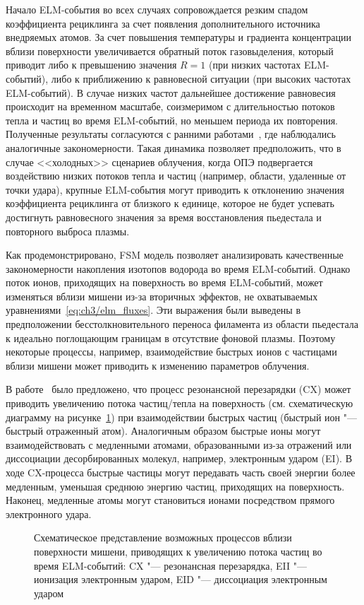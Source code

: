 Начало ELM-события во всех случаях сопровождается резким спадом коэффициента рециклинга за счет появления дополнительного источника внедряемых атомов. За счет повышения температуры и градиента концентрации вблизи поверхности увеличивается обратный поток газовыделения, который приводит либо к превышению значения \(R=1\) (при низких частотах ELM-событий), либо к приближению к равновесной ситуации (при высоких частотах ELM-событий). В случае низких частот дальнейшее достижение равновесия происходит на временном масштабе, соизмеримом с длительностью потоков тепла и частиц во время ELM-событий, но меньшем периода их повторения. Полученные результаты согласуются с ранними работами~\cite{Schmid2016,Smirnov2024}, где наблюдались аналогичные закономерности. Такая динамика позволяет предположить, что в случае <<холодных>> сценариев облучения, когда ОПЭ подвергается воздействию низких потоков тепла и частиц (например, области, удаленные от точки удара), крупные ELM-события могут приводить к отклонению значения коэффициента рециклинга от близкого к единице, которое не будет успевать достигнуть равновесного значения за время восстановления пьедестала и повторного выброса плазмы.  

Как продемонстрировано, FSM модель позволяет анализировать качественные закономерности накопления изотопов водорода во время ELM-событий. Однако поток ионов, приходящих на поверхность во время ELM-событий, может изменяться вблизи мишени из-за вторичных эффектов, не охватываемых уравнениями~\cref{eq:ch3/elm_fluxes}. Эти выражения были выведены в предположении бесстолкновительного переноса филамента из области пьедестала к идеально поглощающим границам в отсутствие фоновой плазмы. Поэтому некоторые процессы, например, взаимодействие быстрых ионов с частицами вблизи мишени может приводить к изменению параметров облучения.

В работе~\cite{Guillemaut2018} было предложено, что процесс резонансной перезарядки (CX) может приводить увеличению потока частиц/тепла на поверхность (см. схематическую диаграмму на рисунке~\cref{fig:ch3/redeposition}) при взаимодействии быстрых частиц (быстрый ион "--- быстрый отраженный атом). Аналогичным образом быстрые ионы могут взаимодействовать с медленными атомами, образованными из-за отражений или диссоциации десорбированных молекул, например, электронным ударом (EI). В ходе CX-процесса быстрые частицы могут передавать часть своей энергии более медленным, уменьшая среднюю энергию частиц, приходящих на поверхность. Наконец, медленные атомы могут становиться ионами посредством прямого электронного удара. 
\begin{figure}[ht]
	\caption{Схематическое представление возможных процессов вблизи поверхности мишени, приводящих к увеличению потока частиц во время ELM-событий: CX "--- резонансная перезарядка, EII "--- ионизация электронным ударом, EID "--- диссоциация электронным ударом}\label{fig:ch3/redeposition}
\end{figure}

